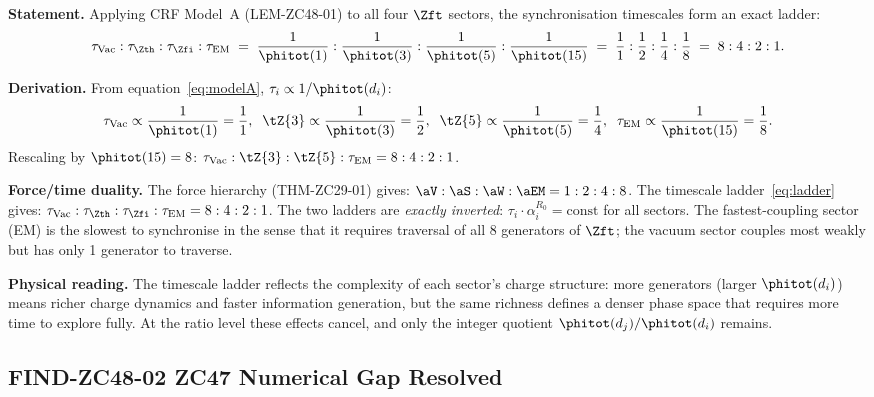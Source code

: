 \documentclass[12pt, a4paper]{article}
\begin{document}
\begin{derivedbox}[title={FIND-ZC48-01: Four-Sector Timescale
  Ladder $8:4:2:1$}]
\textbf{Statement.}
Applying CRF Model~A (LEM-ZC48-01) to all four $\Zft$ sectors,
the synchronisation timescales form an exact ladder:
\begin{equation}
  \tau_{\rm Vac} : \tau_{\Zth} : \tau_{\Zfi} : \tau_{\rm EM}
  \;=\;
  \frac{1}{\phitot(1)} : \frac{1}{\phitot(3)}
    : \frac{1}{\phitot(5)} : \frac{1}{\phitot(15)}
  \;=\;
  \frac{1}{1} : \frac{1}{2} : \frac{1}{4} : \frac{1}{8}
  \;=\;
  8 : 4 : 2 : 1.
  \label{eq:ladder}
\end{equation}

\textbf{Derivation.}
From equation~\eqref{eq:modelA}, $\tau_i \propto 1/\phitot(d_i)$:
\[
  \tau_{\rm Vac} \propto \frac{1}{\phitot(1)} = \frac{1}{1},\;\;
  \tZ{3} \propto \frac{1}{\phitot(3)} = \frac{1}{2},\;\;
  \tZ{5} \propto \frac{1}{\phitot(5)} = \frac{1}{4},\;\;
  \tau_{\rm EM} \propto \frac{1}{\phitot(15)} = \frac{1}{8}.
\]
Rescaling by $\phitot(15) = 8$:
$\tau_{\rm Vac} : \tZ{3} : \tZ{5} : \tau_{\rm EM}
= 8 : 4 : 2 : 1$.

\textbf{Force/time duality.}
The force hierarchy (THM-ZC29-01) gives:
$\aV : \aS : \aW : \aEM = 1 : 2 : 4 : 8$.
The timescale ladder~\eqref{eq:ladder} gives:
$\tau_{\rm Vac} : \tau_{\Zth} : \tau_{\Zfi} : \tau_{\rm EM}
= 8 : 4 : 2 : 1$.
The two ladders are \emph{exactly inverted}:
$\tau_i \cdot \alpha_i^{R_0} = \text{const}$ for all sectors.
The fastest-coupling sector (EM) is the slowest to synchronise
in the sense that it requires traversal of all 8 generators
of $\Zft$; the vacuum sector couples most weakly but has
only 1 generator to traverse.

\textbf{Physical reading.}
The timescale ladder reflects the complexity of each sector's
charge structure: more generators (larger $\phitot(d_i)$) means
richer charge dynamics and faster information generation,
but the same richness defines a denser phase space that
requires more time to explore fully.
At the ratio level these effects cancel, and only the integer
quotient $\phitot(d_j)/\phitot(d_i)$ remains.
\end{derivedbox}

\subsection{FIND-ZC48-02 \quad ZC47 Numerical Gap Resolved}
\label{sec:find02}
\end{document}
